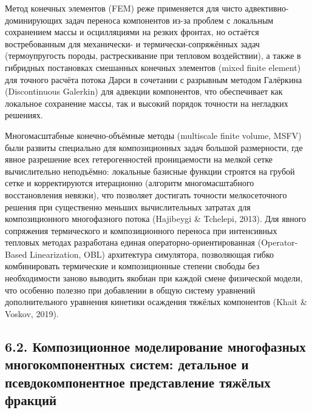 \documentclass[11pt]{extarticle}
\begin{document}
Метод конечных элементов (FEM) реже применяется для чисто адвективно-доминирующих задач переноса компонентов из-за проблем с локальным сохранением массы и осцилляциями на резких фронтах, но остаётся востребованным для механически- и термически-сопряжённых задач (термоупругость породы, растрескивание при тепловом воздействии), а также в гибридных постановках смешанных конечных элементов (mixed finite element) для точного расчёта потока Дарси в сочетании с разрывным методом Галёркина (Discontinuous Galerkin) для адвекции компонентов, что обеспечивает как локальное сохранение массы, так и высокий порядок точности на негладких решениях.

Многомасштабные конечно-объёмные методы (multiscale finite volume, MSFV) были развиты специально для композиционных задач большой размерности, где явное разрешение всех гетерогенностей проницаемости на мелкой сетке вычислительно неподъёмно: локальные базисные функции строятся на грубой сетке и корректируются итерационно (алгоритм многомасштабного восстановления невязки), что позволяет достигать точности мелкосеточного решения при существенно меньших вычислительных затратах для композиционного многофазного потока (Hajibeygi \& Tchelepi, 2013). Для явного сопряжения термического и композиционного переноса при интенсивных тепловых методах разработана единая операторно-ориентированная (Operator-Based Linearization, OBL) архитектура симулятора, позволяющая гибко комбинировать термические и композиционные степени свободы без необходимости заново выводить якобиан при каждой смене физической модели, что особенно полезно при добавлении в общую систему уравнений дополнительного уравнения кинетики осаждения тяжёлых компонентов (Khait \& Voskov, 2019).

\subsection{6.2. Композиционное моделирование многофазных многокомпонентных систем: детальное и псевдокомпонентное представление тяжёлых фракций}\label{ux43aux43eux43cux43fux43eux437ux438ux446ux438ux43eux43dux43dux43eux435-ux43cux43eux434ux435ux43bux438ux440ux43eux432ux430ux43dux438ux435-ux43cux43dux43eux433ux43eux444ux430ux437ux43dux44bux445-ux43cux43dux43eux433ux43eux43aux43eux43cux43fux43eux43dux435ux43dux442ux43dux44bux445-ux441ux438ux441ux442ux435ux43c-ux434ux435ux442ux430ux43bux44cux43dux43eux435-ux438-ux43fux441ux435ux432ux434ux43eux43aux43eux43cux43fux43eux43dux435ux43dux442ux43dux43eux435-ux43fux440ux435ux434ux441ux442ux430ux432ux43bux435ux43dux438ux435-ux442ux44fux436ux451ux43bux44bux445-ux444ux440ux430ux43aux446ux438ux439}
\end{document}
